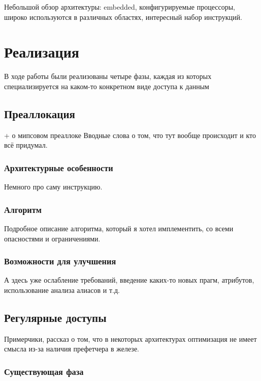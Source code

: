 \documentclass[12pt,a4paper]{article}
\begin{document}
Небольшой обзор архитектуры: embedded, конфигурируемые процессоры, широко используются в различных областях, интересный набор инструкций.

\section{Реализация}

В ходе работы были реализованы четыре фазы, каждая из которых специализируется на каком-то конкретном виде доступа к данным

\subsection{Преаллокация}

+ о мипсовом преаллоке
Вводные слова о том, что тут вообще происходит и кто всё придумал.

\subsubsection{Архитектурные особенности}

Немного про саму инструкцию.

\subsubsection{Алгоритм}

Подробное описание алгоритма, который я хотел имплементить, со всеми опасностями и ограничениями.

\subsubsection{Возможности для улучшения}

А здесь уже ослабление требований, введение каких-то новых прагм, атрибутов, использование анализа алиасов и т.д.

\subsection{Регулярные доступы}

Примерчики, рассказ о том, что в некоторых архитектурах оптимизация не имеет смысла из-за наличия префетчера в железе.

\subsubsection{Существующая фаза}
\end{document}
